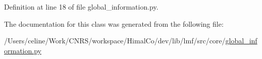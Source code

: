 Definition at line 18 of file global\+\_\+information.\+py.



The documentation for this class was generated from the following file\+:\begin{DoxyCompactItemize}
\item 
/\+Users/celine/\+Work/\+C\+N\+R\+S/workspace/\+Himal\+Co/dev/lib/lmf/src/core/\hyperlink{global__information_8py}{global\+\_\+information.\+py}\end{DoxyCompactItemize}
